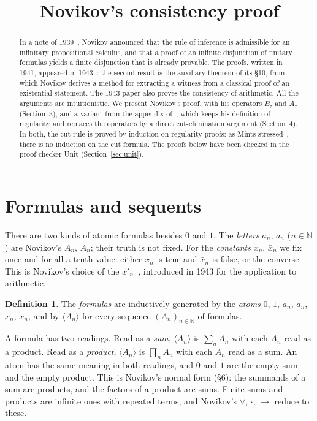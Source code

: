 \documentclass[11pt]{amsart}
\title{Novikov's consistency proof}
\author{}
\date{}
\theoremstyle{definition}
\newtheorem{definition}[theorem]{Definition}
\theoremstyle{remark}
\newcommand{\seq}[1]{\langle #1\rangle}
\newcommand{\nx}{\bar x}
\newcommand{\N}{\mathbb{N}}
\begin{document}
\begin{abstract}
  In a note of 1939~\cite{Novikov39}, Novikov announced that the rule of
  inference is admissible for an infinitary propositional calculus, and
  that a proof of an infinite disjunction of finitary formulas yields a
  finite disjunction that is already provable. The proofs, written in 1941,
  appeared in 1943~\cite{Novikov}: the second result is the auxiliary
  theorem of its \S10, from which Novikov derives a method for extracting
  a witness from a classical proof of an existential statement. The 1943
  paper also proves the consistency of arithmetic. All the arguments are
  intuitionistic.
  We present Novikov's proof, with his operators $B_\tau$ and $A_\tau$
  (Section~3), and a variant from the appendix of~\cite{Coquand}, which
  keeps his definition of regularity and replaces the operators by a
  direct cut-elimination argument (Section~4). In both, the cut rule is
  proved by induction on regularity proofs: as Mints
  stressed~\cite{Mints}, there is no induction on the cut formula. The proofs below
  have been checked in the proof checker Unit (Section~\ref{sec:unit}).
\end{abstract}
\maketitle

\section{Formulas and sequents}

There are two kinds of atomic formulas besides $0$ and $1$. The
\emph{letters} $a_n$, $\bar a_n$ ($n\in\N$) are Novikov's $A_n$, $\bar A_n$;
their truth is not fixed. For the \emph{constants} $x_n$, $\nx_n$ we fix
once and for all a truth value: either $x_n$ is true and $\nx_n$ is false,
or the converse. This is Novikov's choice of the $x'_n$~\cite[\S3]{Novikov},
introduced in 1943 for the application to arithmetic.

\begin{definition}
  The \emph{formulas} are inductively generated by the \emph{atoms} $0$,
  $1$, $a_n$, $\bar a_n$, $x_n$, $\nx_n$, and by $\seq{A_n}$ for every
  sequence $(A_n)_{n\in\N}$ of formulas.
\end{definition}

A formula has two readings. Read as a \emph{sum}, $\seq{A_n}$ is
$\sum_n A_n$ with each $A_n$ read as a product. Read as a \emph{product},
$\seq{A_n}$ is $\prod_n A_n$ with each $A_n$ read as a sum. An atom has
the same meaning in both readings, and $0$ and $1$
are the empty sum and the empty product. This is Novikov's normal form
(\S6): the summands of a sum are products, and the factors of a product
are sums. Finite sums and products are infinite ones with repeated terms,
and Novikov's $\vee$, $\cdot$, $\to$ reduce to these.
\end{document}
